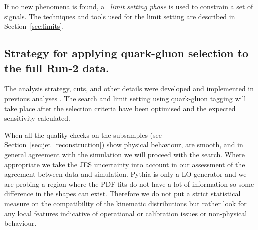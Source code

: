 If no new phenomena is found, a ~\textit{limit setting phase} is used
to constrain a set of signals. 
The techniques and tools used for the limit setting are described in
Section~\ref{sec:limits}. 

\subsection{Strategy for applying quark-gluon selection to the full Run-2 data.}
\label{sec:2018data}

The analysis strategy, cuts, and other details were developed and implemented in previous analyses \cite{Aad:2019hjw,Nishu:2646455}.  
The search and limit setting using quark-gluon tagging will take place after the selection criteria 
have been optimised and the expected sensitivity calculated.

When all the quality checks on the subsamples (see Section~\ref{sec:jet_reconstruction})
show physical behaviour, are smooth, and in general agreement
with the simulation we will proceed with the search.
Where appropriate we take the
JES uncertainty into account in our assessment of the agreement
between data and simulation. 
Pythia is only a LO generator
and we are probing a region where the PDF fits do not
have a lot of information so some difference in the shapes
can exist. Therefore we do not put a strict statistical measure
on the compatibility of the kinematic distributions but rather
look for any local features indicative of operational or
calibration issues or non-physical behaviour.
